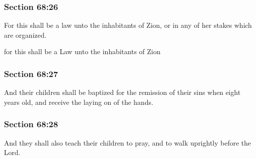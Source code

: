 	\subsubsection{Section 68:26} %
		\label{DC68-26}

		For this shall be a law unto the inhabitants of Zion, or in any of her stakes which are organized.

		\begin{framed}
		\scriptsize
			\begin{compactdesc}
				\item[JSP] for this shall be a Law unto the inhabitants of Zion
			\end{compactdesc}
		\end{framed}

	\subsubsection{Section 68:27} %
		\label{DC68-27}

		And their children shall be baptized for the remission of their sins when eight years old, and receive the laying on of the hands.


	\subsubsection{Section 68:28} %
		\label{DC68-28}

		And they shall also teach their children to pray, and to walk uprightly before the Lord.


